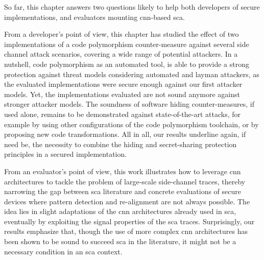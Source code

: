 So far, this chapter answers two questions likely to help both developers of secure implementations, and evaluators mounting \gls{cnn}-based \gls{sca}.

From a developer's point of view, this chapter has studied the effect of two implementations of a code polymorphism counter-measure against several side channel attack scenarios, covering a wide range of potential attackers.
In a nutshell, code polymorphism as an automated tool, is able to provide a strong protection against threat models considering automated and layman attackers, as the evaluated implementations were secure enough against our first attacker models.
Yet, the implementations evaluated are not sound anymore against stronger attacker models.
The soundness of software hiding counter-measures, if used alone, remains to be demonstrated against state-of-the-art attacks, for example by using other configurations of the code polymorphism toolchain, or by proposing new code transformations.  
All in all, our results underline again, if need be, the necessity to combine the hiding and secret-sharing protection principles in a secured implementation.

From an evaluator's point of view, this work illustrates how to leverage \gls{cnn} architectures to tackle the problem of large-scale side-channel traces, thereby narrowing the gap between \gls{sca} literature and concrete evaluations of secure devices where pattern detection and re-alignment are not always possible.
The idea lies in slight adaptations of the \gls{cnn} architectures already used in \gls{sca}, eventually by exploiting the signal properties of the \gls{sca} traces.
Surprisingly, our results emphasize that, though the use of more complex \gls{cnn} architectures has been shown to be sound to succeed \gls{sca} in the literature, it might not be a necessary condition in an \gls{sca} context.
